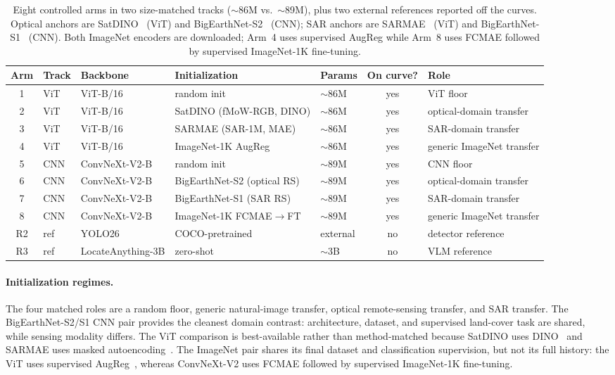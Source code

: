 \documentclass[10pt,twocolumn,letterpaper]{article}
\begin{document}
\begin{table}[t]
\centering
\small
\setlength{\tabcolsep}{5pt}
\begin{tabular}{@{}cllllcl@{}}
\toprule
\textbf{Arm} & \textbf{Track} & \textbf{Backbone} & \textbf{Initialization} & \textbf{Params} & \textbf{On curve?} & \textbf{Role} \\
\midrule
1 & ViT & ViT-B/16 & random init & $\sim$86M & yes & ViT floor \\
2 & ViT & ViT-B/16 & SatDINO (fMoW-RGB, DINO) & $\sim$86M & yes & optical-domain transfer \\
3 & ViT & ViT-B/16 & SARMAE (SAR-1M, MAE) & $\sim$86M & yes & SAR-domain transfer \\
4 & ViT & ViT-B/16 & ImageNet-1K AugReg & $\sim$86M & yes & generic ImageNet transfer \\
5 & CNN & ConvNeXt-V2-B & random init & $\sim$89M & yes & CNN floor \\
6 & CNN & ConvNeXt-V2-B & BigEarthNet-S2 (optical RS) & $\sim$89M & yes & optical-domain transfer \\
7 & CNN & ConvNeXt-V2-B & BigEarthNet-S1 (SAR RS) & $\sim$89M & yes & SAR-domain transfer \\
8 & CNN & ConvNeXt-V2-B & ImageNet-1K FCMAE$\rightarrow$FT & $\sim$89M & yes & generic ImageNet transfer \\
\addlinespace
R2 & ref & YOLO26 & COCO-pretrained & external & no & detector reference \\
R3 & ref & LocateAnything-3B & zero-shot & $\sim$3B & no & VLM reference \\
\bottomrule
\end{tabular}
\caption{Eight controlled arms in two size-matched tracks ($\sim$86M vs.\
$\sim$89M), plus two external references reported off the curves. Optical
anchors are SatDINO~\cite{straka2025satdino} (ViT) and
BigEarthNet-S2~\cite{clasen2025reben} (CNN); SAR anchors are
SARMAE~\cite{liu2026sarmae} (ViT) and BigEarthNet-S1~\cite{clasen2025reben}
(CNN). Both ImageNet encoders are downloaded; Arm~4 uses supervised AugReg
while Arm~8 uses FCMAE followed by supervised ImageNet-1K fine-tuning.}
\label{tab:arms}
\end{table}

\paragraph{Initialization regimes.} The four matched roles are a random floor,
generic natural-image transfer, optical remote-sensing transfer, and SAR
transfer. The BigEarthNet-S2/S1 CNN pair provides the cleanest domain contrast:
architecture, dataset, and supervised land-cover task are shared, while
sensing modality differs. The ViT comparison is best-available rather than
method-matched because SatDINO uses DINO~\cite{caron2021emerging} and SARMAE
uses masked autoencoding~\cite{he2022masked}. The ImageNet pair shares its
final dataset and classification supervision, but not its full history: the
ViT uses supervised AugReg~\cite{steiner2021trainvit}, whereas ConvNeXt-V2 uses
FCMAE followed by supervised ImageNet-1K fine-tuning.
\end{document}
